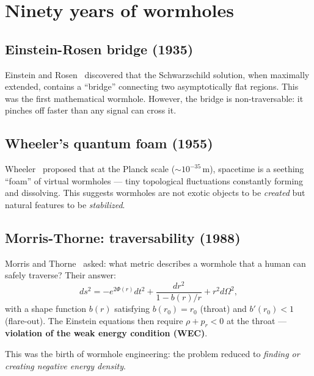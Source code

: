 \documentclass[11pt,a4paper]{article}
\begin{document}
\section{Ninety years of wormholes}
\label{sec:history}

\subsection{Einstein-Rosen bridge (1935)}

Einstein and Rosen~\cite{EinsteinRosen1935} discovered that the
Schwarzschild solution, when maximally extended, contains a
``bridge'' connecting two asymptotically flat regions. This was
the first mathematical wormhole. However, the bridge is
non-traversable: it pinches off faster than any signal can cross it.

\subsection{Wheeler's quantum foam (1955)}

Wheeler~\cite{Wheeler1957} proposed that at the Planck scale
($\sim 10^{-35}\,\mathrm{m}$), spacetime is a seething ``foam''
of virtual wormholes --- tiny topological fluctuations constantly
forming and dissolving. This suggests wormholes are not exotic
objects to be \emph{created} but natural features to be
\emph{stabilized}.

\subsection{Morris-Thorne: traversability (1988)}

Morris and Thorne~\cite{MorrisThorne1988} asked: what metric
describes a wormhole that a human can safely traverse? Their answer:
\begin{equation}
  ds^2 = -e^{2\Phi(r)}dt^2 + \frac{dr^2}{1-b(r)/r} + r^2 d\Omega^2,
  \label{eq:mt}
\end{equation}
with a shape function $b(r)$ satisfying $b(r_0) = r_0$ (throat)
and $b'(r_0) < 1$ (flare-out). The Einstein equations then require
$\rho + p_r < 0$ at the throat --- \textbf{violation of the weak
energy condition (WEC)}.

This was the birth of wormhole engineering: the problem reduced to
\emph{finding or creating negative energy density}.
\end{document}

